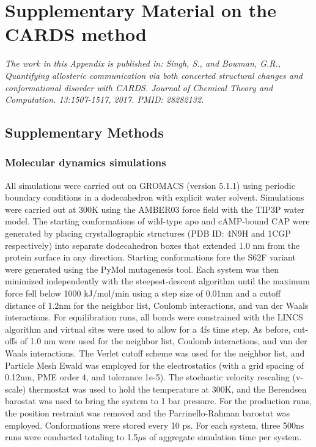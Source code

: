 \documentclass[../main.tex]{subfiles}
\begin{document}
	
	\graphicspath{{AppendixA/}}
	\chapter{Supplementary Material on the CARDS method}
	\label{ch:cards-supp-info}
	
    \textit{The work in this Appendix is published in: Singh, S., 
    and Bowman, G.R., Quantifying allosteric communication via both concerted 
    structural changes and conformational disorder with CARDS. Journal of 
    Chemical Theory and Computation. 13:1507-1517, 2017. PMID: 28282132.}\cite{Singh:2017hha} 
	
	\section{Supplementary Methods}
    \subsection{Molecular dynamics simulations}
        All simulations were carried out on GROMACS (version 5.1.1)\cite{Abraham:2015gj,VanDerSpoel:2005hz} using periodic boundary conditions in a dodecahedron with explicit water solvent. Simulations were carried out at 300K using the AMBER03\cite{Duan:2003gt} force field with the TIP3P water model\cite{Jorgensen:1983fl}. The starting conformations of wild-type apo and cAMP-bound CAP were generated by placing crystallographic structures (PDB ID: 4N9H and 1CGP respectively)\cite{Seok:2014cs,Schultz:1991uh} into separate dodecahedron boxes that extended 1.0 nm from the protein surface in any direction. Starting conformations fore the S62F variant were generated using the PyMol\cite{DeLano:2010wf} mutagenesis tool. Each system was then minimized independently with the steepest-descent algorithm until the maximum force fell below 1000 kJ/mol/min using a step size of 0.01nm and a cutoff distance of 1.2nm for the neighbor list, Coulomb interactions, and van der Waals interactions. For equilibration runs, all bonds were constrained with the LINCS algorithm\cite{Hess:2008fl} and virtual sites\cite{Feenstra:1999ue} were used to allow for a 4fs time step. As before, cut-offs of 1.0 nm were used for the neighbor list, Coulomb interactions, and van der Waals interactions. The Verlet cutoff scheme was used for the neighbor list, and Particle Mesh Ewald\cite{Essmann:1995gi} was employed for the electrostatics (with a grid spacing of 0.12nm, PME order 4, and tolerance 1e-5). The stochastic velocity rescaling (v-scale) thermostat\cite{Bussi:2007cs} was used to hold the temperature at 300K, and the Berendsen barostat\cite{Berendsen:1984fm} was used to bring the system to 1 bar pressure. For the production runs, the position restraint was removed and the Parrinello-Rahman barostat\cite{Parrinello:1981it} was employed. Conformations were stored every 10 ps. For each system, three 500ns runs were conducted totaling to 1.5$\mu$s of aggregate simulation time per system. 
\end{document}
